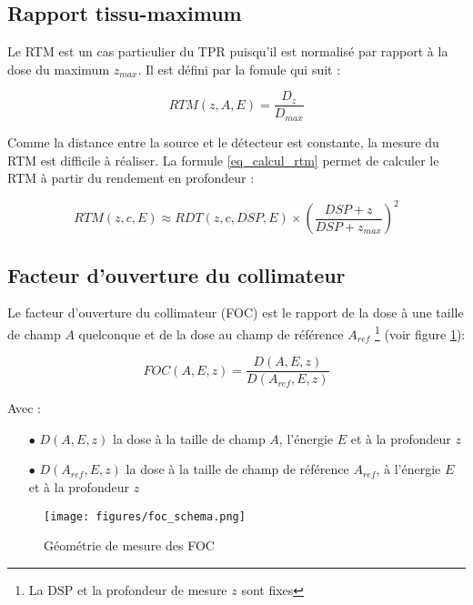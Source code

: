 \documentclass{book}
\begin{document}
\subsection{Rapport tissu-maximum}

Le RTM est un cas particulier du TPR puisqu'il est normalisé par rapport à la dose du maximum $z_{max}$. Il est défini par la fomule qui suit :

\begin{equation}
    RTM(z, A, E) = \dfrac{D_z}{D_{max}}
    \label{eq_rtm}
\end{equation}

Comme la distance entre la source et le détecteur est constante, la mesure du RTM est difficile à réaliser. La formule \ref{eq_calcul_rtm} permet de calculer le RTM à partir du rendement en profondeur \cite{podgorsak2005radiation} :

\begin{equation}
    RTM(z, c, E) \approx RDT(z, c, DSP, E) \times \left(\dfrac{DSP + z}{DSP + z_{max}}\right)^2
    \label{eq_calcul_rtm}
\end{equation}

\subsection{Facteur d'ouverture du collimateur}

Le facteur d'ouverture du collimateur (FOC) est le rapport de la dose à une taille de champ $A$ quelconque et de la dose au champ de référence $A_{ref}$ \footnote{La DSP et la profondeur de mesure $z$ sont fixes} (voir figure \ref*{fig_foc}):

\begin{equation}
    FOC(A, E, z) = \dfrac{D(A, E, z)}{D(A_{ref}, E, z)}
    \label{eq_foc}
\end{equation}

Avec :

\begin{itemize}
    \item[$\bullet$] $D(A, E, z)$ la dose à la taille de champ $A$, l'énergie $E$ et à la profondeur $z$
    \item[$\bullet$] $D(A_{ref}, E, z)$ la dose à la taille de champ de référence $A_{ref}$, à l'énergie $E$ et à la profondeur $z$
\end{itemize}

\begin{figure}[h]
  \centering
  \texttt{[image: figures/foc\_schema.png]}
  \caption{Géométrie de mesure des FOC \cite{mayles2007handbook}}
  \label{fig_foc}
\end{figure}
\end{document}
